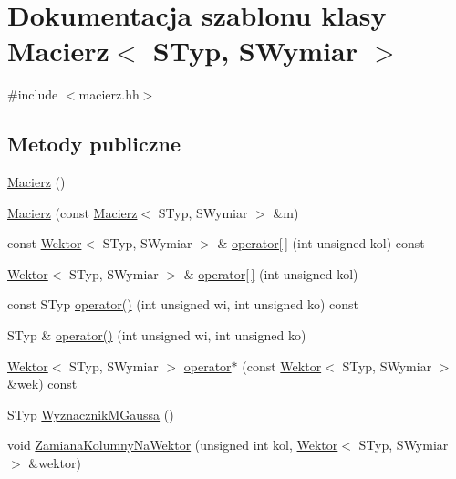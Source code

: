 \hypertarget{class_macierz}{}\section{Dokumentacja szablonu klasy Macierz$<$ S\+Typ, S\+Wymiar $>$}
\label{class_macierz}


{\ttfamily \#include $<$macierz.\+hh$>$}

\subsection*{Metody publiczne}
\begin{DoxyCompactItemize}
\item 
\mbox{\hyperlink{class_macierz_a7e46fe9d8c2c8a6c3b4d3b7ecd800de6}{Macierz}} ()
\item 
\mbox{\hyperlink{class_macierz_a2cfe43e1022f5fe056b83094599b28f3}{Macierz}} (const \mbox{\hyperlink{class_macierz}{Macierz}}$<$ S\+Typ, S\+Wymiar $>$ \&m)
\item 
const \mbox{\hyperlink{class_wektor}{Wektor}}$<$ S\+Typ, S\+Wymiar $>$ \& \mbox{\hyperlink{class_macierz_adeb8d422bb1765f12fb75aaada3591b7}{operator\mbox{[}$\,$\mbox{]}}} (int unsigned kol) const
\item 
\mbox{\hyperlink{class_wektor}{Wektor}}$<$ S\+Typ, S\+Wymiar $>$ \& \mbox{\hyperlink{class_macierz_a345fd825f8e3e48b4a52cd051064c511}{operator\mbox{[}$\,$\mbox{]}}} (int unsigned kol)
\item 
const S\+Typ \mbox{\hyperlink{class_macierz_aaa1b2fe219f9ee1d77ab1d747a47867b}{operator()}} (int unsigned wi, int unsigned ko) const
\item 
S\+Typ \& \mbox{\hyperlink{class_macierz_ad850419e7a84e1ae0f034338dbc1bdc5}{operator()}} (int unsigned wi, int unsigned ko)
\item 
\mbox{\hyperlink{class_wektor}{Wektor}}$<$ S\+Typ, S\+Wymiar $>$ \mbox{\hyperlink{class_macierz_a1d27f272c4adf72f021adb08b896920a}{operator$\ast$}} (const \mbox{\hyperlink{class_wektor}{Wektor}}$<$ S\+Typ, S\+Wymiar $>$ \&wek) const
\item 
S\+Typ \mbox{\hyperlink{class_macierz_ab481b30cfb31616ce940756a6c32086f}{Wyznacznik\+M\+Gaussa}} ()
\item 
void \mbox{\hyperlink{class_macierz_a384c34a635c0409126985eb722287d93}{Zamiana\+Kolumny\+Na\+Wektor}} (unsigned int kol, \mbox{\hyperlink{class_wektor}{Wektor}}$<$ S\+Typ, S\+Wymiar $>$ \&wektor)
\end{DoxyCompactItemize}
